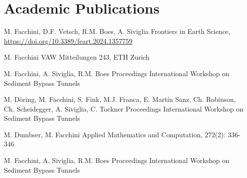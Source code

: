 
\section{Academic Publications}

M. Facchini, D.F. Vetsch, R.M. Boes, A. Siviglia
Frontiers in Earth Science, \url{https://doi.org/10.3389/feart.2024.1357759}
\sectionsep

M. Facchini
VAW Mitteilungen 243, ETH Zurich
\sectionsep

M. Facchini, A. Siviglia, R.M. Boes
Proceedings International Workshop on Sediment Bypass Tunnels
\sectionsep

M. Döring, M. Facchini, S. Fink, M.J. Franca, E. Martín Sanz, Ch. Robinson, Ch. Scheidegger, A. Siviglia, C. Tockner
Proceedings International Workshop on Sediment Bypass Tunnels
\sectionsep

M. Dumbser, M. Facchini
Applied Mathematics and Computation, 272(2): 336-346
\sectionsep

M. Facchini, A. Siviglia, R.M. Boes
Proceedings International Workshop on Sediment Bypass Tunnels
\sectionsep
